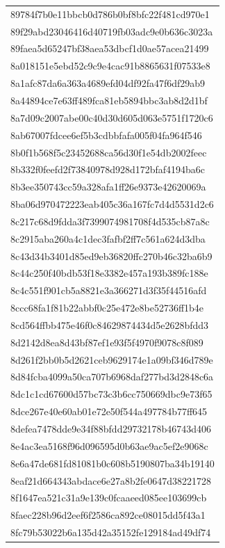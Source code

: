 \begin{tabular}{l}
89784f7b0e11bbcb0d786b0bf8bfc22f481cd970e1 \\
89f29abd23046416d40719fb03adc9e0b636c3023a \\
89faea5d65247bf38aea53dbcf1d0ae57acea21499 \\
8a018151e5ebd52c9c9e4cac91b8865631f07533e8 \\
8a1afc87da6a363a4689efd04df92fa47f6df29ab9 \\
8a44894ce7e63ff489fca81eb5894bbc3ab8d2d1bf \\
8a7d09c2007abe00c40d30d605d063e5751f1720c6 \\
8ab67007fdcee6ef5b3cdbbfafa005f04fa964f546 \\
8b0f1b568f5c23452688ca56d30f1e54db2002feec \\
8b332f0feefd2f73840978d928d172bfaf4194ba6c \\
8b3ee350743cc59a328afa1ff26e9373e42620069a \\
8ba06d970472223eab405c36a167fc7d4d5531d2c6 \\
8c217c68d9fdda3f7399074981708f4d535cb87a8c \\
8c2915aba260a4c1dec3fafbf2ff7c561a624d3dba \\
8c43d34b3401d85ed9eb36820ffc270b46c32ba6b9 \\
8c44c250f40bdb53f18e3382e457a193b389fc188e \\
8c4c551f901cb5a8821e3a366271d3f35f44516afd \\
8ccc68fa1f81b22abbf0c25e472e8be52736ff1b4e \\
8cd564ffbb475e46f0c84629874434d5e2628bfdd3 \\
8d2142d8ea8d43bf87ef1e93f5f4970f9078c8f089 \\
8d261f2bb0b5d2621ceb9629174e1a09bf346d789e \\
8d84fcba4099a50ca707b6968daf277bd3d2848c6a \\
8dc1c1cd67600d57bc73c3b6cc750669dbc9e73f65 \\
8dce267e40e60ab01e72e50f544a497784b77ff645 \\
8defea7478dde9e34f88bfdd29732178b46743d406 \\
8e4ac3ea5168f96d096595d0b63ae9ac5ef2e9068c \\
8e6a47de681fd81081b0c608b5190807ba34b19140 \\
8eaf21d664343abdace6e27a8b2fe0647d38221728 \\
8f1647ea521c31a9e139c0fcaaeed085ee103699cb \\
8faec228b96d2eef6f2586ca892ce08015dd5f43a1 \\
8fc79b53022b6a135d42a35152fe129184ad49df74 \\

\end{tabular}
